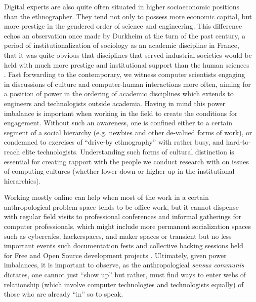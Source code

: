 \documentclass[10pt,letter,oneside]{scrartcl}
\begin{document}
Digital experts are also quite often situated in higher socioeconomic 
positions than the ethnographer. They tend not only to possess more economic 
capital, but more prestige in the gendered order of science and engineering. 
This difference echos an observation once made by Durkheim at the turn of 
the past century, a period of institutionalization of sociology as an 
academic discipline in France, that it was quite obvious that disciplines 
that served industrial societies would be held with much more prestige and 
institutional support than the human sciences \cite{Durkheim1956}. Fast forwarding 
to the contemporary, we witness computer scientists engaging in discussions of 
culture and computer-human interactions more often, aiming for a position of 
power in the ordering of academic disciplines which extends to engineers and 
technologists outside academia. Having in mind this power imbalance is important 
when working in the field to create the conditions for engagement.  Without such 
an awareness, one is confined either to a certain segment of a social hierarchy
(e.g. newbies and other de-valued forms of work), or condemned to exercises of 
``drive-by ethnography'' with rather busy, and hard-to-reach elite technologists.  
Understanding such forms of cultural distinction is essential for creating rapport 
with the people we conduct research with on issues of computing cultures (whether 
lower down or higher up in the institutional hierarchies).  

Working mostly online can help when most of the work in a certain
anthropological problem space tends to be office work, but it cannot
dispense with regular field visits to professional conferences and
informal gatherings for computer professionals, which might include
more permanent socialization spaces such as cybercafes, hackerspaces,
and maker spaces or transient but no less important events such
documentation fests and collective hacking sessions held for Free and
Open Source development projects \cite{Coleman2010,Burrell2012}. 
Ultimately, given power imbalances, it is important to observe, as 
the anthropological \emph{sensus communis} dictates, one cannot just 
``show up'' but rather, must find ways to enter webs of relationship 
(which involve computer technologies and technologists equally) of those 
who are already ``in'' so to speak.
\end{document}
